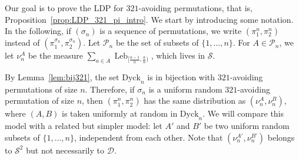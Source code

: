\documentclass[a4paper,11pt]{amsart}
\DeclareMathOperator{\Leb}{Leb}
\newtheorem{prop}[thm]{Proposition}
\theoremstyle{definition}
\begin{document}
Our goal is to prove the LDP for $321$-avoiding permutations, that is, Proposition~\ref{prop:LDP_321_pi_intro}.
We start by introducing some notation. In the following, if $(\sigma_n)$ is a sequence of permutations, we write $\left( \pi_1^n, \pi_2^n \right)$ instead of $\left( \pi_1^{\sigma_n}, \pi_2^{\sigma_n} \right).$
Let $\mathcal P_n$ be the set of subsets of $\{1,\dots,n\}$. For $A \in \mathcal{P}_n$, we let $\nu_n^A$ be the measure $\sum_{a \in A}  \Leb_{[\frac{a-1}{n}, \frac a n )}$, which lives in $\mathcal S$.

By Lemma~\ref{lem:bij321}, the set $\mathrm{Dyck}_{n}$ is in bijection with $321$-avoiding permutations of size $n.$
Therefore, if $\sigma_n$ is a uniform random $321$-avoiding permutation of size $n$, then $\left( \pi_1^n, \pi_2^n \right)$ has the same distribution as $(\nu_n^A,\nu_n^B)$,
where $(A,B)$ is taken uniformly at random in $\mathrm{Dyck}_{n}$.
We will compare this model with a related but simpler model:
let $A'$ and $B'$ be two uniform random subsets of $\{1,\dots,n\}$,
independent from each other. 
Note that $(\nu_n^{A'},\nu_n^{B'})$ belongs to $\mathcal S^2$ but not necessarily to $\mathcal D.$
\end{document}
